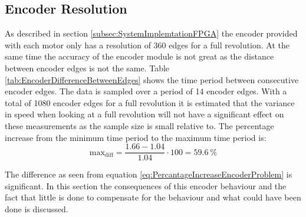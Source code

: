 \documentclass[../../main.tex]{subfiles}
\begin{document}



\subsection*{Encoder Resolution}
As described in section \ref{subsec:SystemImplemtationFPGA} the encoder provided with each motor only has a resolution of 360 edges for a full revolution. At the same time the accuracy of the encoder module is not great as the distance between encoder edges is not the same. Table \ref{tab:EncoderDifferenceBetweenEdges} shows the time period between consecutive encoder edges. The data is sampled over a period of 14 encoder edges. With a total of 1080 encoder edges for a full revolution it is estimated that the variance in speed when looking at a full revolution will not have a significant effect on these measurements as the sample size is small relative to. The percentage increase from the minimum time period to the maximum time period is:
\begin{equation} \label{eq:PercantageIncreaseEncoderProblem}
    \mathrm{max_{diff}} = \frac{1.66 - 1.04}{1.04} \cdot 100 = \SI{59.6}{\percent} 
\end{equation}

The difference as seen from equation \ref{eq:PercantageIncreaseEncoderProblem} is significant. In this section the consequences of this encoder behaviour and the fact that little is done to compensate for the behaviour and what could have been done is discussed.
\end{document}
